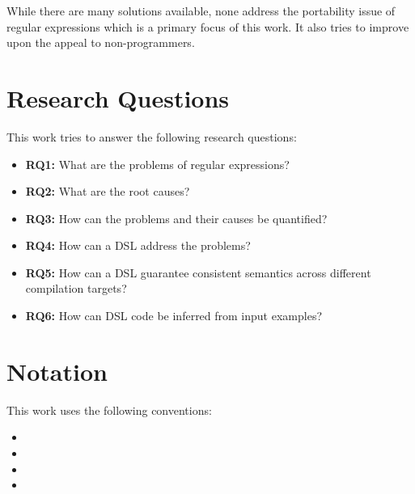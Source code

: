 While there are many solutions available, none address the portability issue of regular expressions which is a primary focus of this work. It also tries to improve upon the appeal to non-programmers.

\section{Research Questions}

This work tries to answer the following research questions:


\newcommand*{\RQone}{What are the problems of regular expressions?}
\newcommand*{\RQtwo}{What are the root causes?}
\newcommand*{\RQthree}{How can the problems and their causes be quantified?}
\newcommand*{\RQfour}{How can a DSL address the problems?}
\newcommand*{\RQfive}{How can a DSL guarantee consistent semantics across different compilation targets?}
\newcommand*{\RQsix}{How can DSL code be inferred from input examples?}

\begin{itemize}
    \item \textbf{RQ1:} \RQone
    \item \textbf{RQ2:} \RQtwo
    \item \textbf{RQ3:} \RQthree
    \item \textbf{RQ4:} \RQfour
    \item \textbf{RQ5:} \RQfive
    \item \textbf{RQ6:} \RQsix
\end{itemize}

\section{Notation}

This work uses the following conventions:

\begin{itemize}
    \item {}
    \item {}
    \item {}
    \item {}
\end{itemize}

